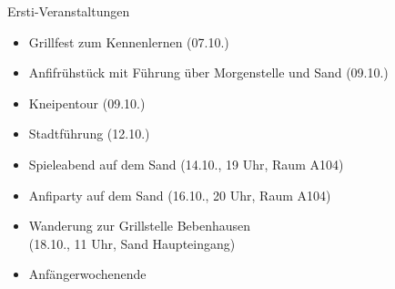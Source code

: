 \documentclass{beamer}
\begin{document}
	\begin{frame}{Ersti-Veranstaltungen}
		\begin{itemize}
			\item Grillfest zum Kennenlernen (07.10.)
			\item Anfifrühstück mit Führung über Morgenstelle und Sand (09.10.)
			\item Kneipentour (09.10.)
			\item Stadtführung (12.10.)
			\item Spieleabend auf dem Sand (14.10., 19 Uhr, Raum A104) %
			\item Anfiparty auf dem Sand (16.10., 20 Uhr, Raum A104) %
			\item Wanderung zur Grillstelle Bebenhausen \\ (18.10., 11 Uhr, Sand Haupteingang) 
			\item Anfängerwochenende
		\end{itemize}
	\end{frame}





	
\end{document}
